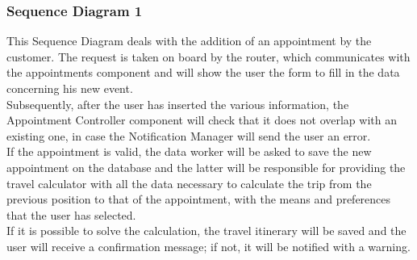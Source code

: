 \documentclass [12pt]{article}
\begin{document}
\subsubsection{Sequence Diagram 1}
This Sequence Diagram deals with the addition of an appointment by the customer. The request is taken on board by the router, which communicates with the appointments component and will show the user the form to fill in the data concerning his new event.\\
Subsequently, after the user has inserted the various information, the Appointment Controller component will check that it does not overlap with an existing one, in case the Notification Manager will send the user an error.\\
If the appointment is valid, the data worker will be asked to save the new appointment on the database and the latter will be responsible for providing the travel calculator with all the data necessary to calculate the trip from the previous position to that of the appointment, with the means and preferences that the user has selected.\\
If it is possible to solve the calculation, the travel itinerary will be saved and the user will receive a confirmation message; if not, it will be notified with a warning.
\\
\end{document}
